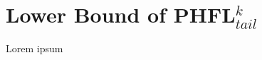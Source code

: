 
\section{Lower Bound of PHFL$^{k}_{tail}$}
\label{sec:phfl_k_plus_1_tail_equals_k_expspace_lower_bounds}
Lorem ipsum